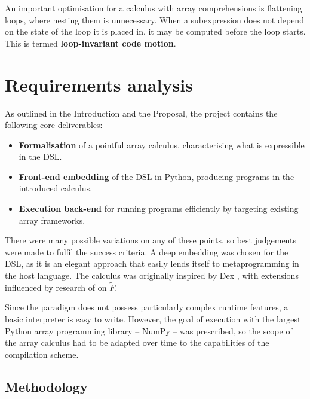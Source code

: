 An important optimisation for a calculus with array comprehensions is flattening loops, where nesting them is unnecessary. When a subexpression does not depend on the state of the loop it is placed in, it may be computed before the loop starts. This is termed \textbf{loop-invariant code motion}.

\section{Requirements analysis}
\label{requirements-analysis}

As outlined in the Introduction and the Proposal, the project contains the following core deliverables:
\begin{itemize}
    \item \textbf{Formalisation} of a pointful array calculus, characterising what is expressible in the DSL.
    \item \textbf{Front-end embedding} of the DSL in Python, producing programs in the introduced calculus.
    \item \textbf{Execution back-end} for running programs efficiently by targeting existing array frameworks.
\end{itemize}
There were many possible variations on any of these points, so best judgements were made to fulfil the success criteria. A deep embedding was chosen for the DSL, as it is an elegant approach that easily lends itself to metaprogramming in the host language. 
The calculus was originally inspired by Dex \cite{paszke2021getting}, with extensions influenced by research of \textcite{shaikhha2019efficient} on $\tilde F$. 

Since the paradigm does not possess particularly complex runtime features, a basic interpreter is easy to write. However, the goal of execution with the largest Python array programming library -- NumPy -- was prescribed, so the scope of the array calculus had to be adapted over time to the capabilities of the compilation scheme. 

\subsection{Methodology}

